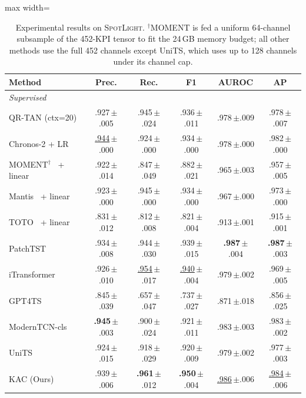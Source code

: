 \documentclass[conference]{IEEEtran}
\newcommand{\sd}[1]{\,{\fontsize{6pt}{7pt}\selectfont $\pm$#1}}
\begin{document}
\begin{table}[t]
  \centering
  \caption{Experimental results on \textsc{SpotLight}. $^\dagger$MOMENT is fed a uniform 64-channel subsample of the 452-KPI tensor to fit the 24\,GB memory budget; all other methods use the full 452 channels except UniTS, which uses up to 128 channels under its channel cap.}
  \label{tab:spotlight_benchmark}
  \small
  \setlength{\tabcolsep}{2pt}
  \begin{adjustbox}{max width=\columnwidth}
  \begin{tabular}{@{}lccccc@{}}
    \toprule
    \textbf{Method} & \textbf{Prec.} & \textbf{Rec.} & \textbf{F1} & \textbf{AUROC} & \textbf{AP} \\
    \midrule
    \multicolumn{6}{l}{\emph{Supervised}} \\
    QR-TAN (ctx=20)                      & .927\sd{.005} & .945\sd{.024} & .936\sd{.011} & .978\sd{.009} & .978\sd{.007} \\
    Chronos-2 + LR                       & \underline{.944}\sd{.000} & .924\sd{.000} & .934\sd{.000} & .978\sd{.000} & .982\sd{.000} \\
    MOMENT$^\dagger$~\cite{goswami2024moment} + linear      & .922\sd{.014} & .847\sd{.049} & .882\sd{.021} & .965\sd{.003} & .957\sd{.005} \\
    Mantis~\cite{feofanov2025mantis} + linear     & .923\sd{.000} & .945\sd{.000} & .934\sd{.000} & .967\sd{.000} & .973\sd{.000} \\
    TOTO~\cite{cohen2025toto} + linear            & .831\sd{.012} & .812\sd{.008} & .821\sd{.004} & .913\sd{.001} & .915\sd{.001} \\
    PatchTST~\cite{nie2023patchtst}      & .934\sd{.008} & .944\sd{.030} & .939\sd{.015} & \textbf{.987}\sd{.004} & \textbf{.987}\sd{.003} \\
    iTransformer~\cite{liu2024itransformer} & .926\sd{.010} & \underline{.954}\sd{.017} & \underline{.940}\sd{.004} & .979\sd{.002} & .969\sd{.005} \\
    GPT4TS~\cite{zhou2023gpt4ts}         & .845\sd{.039} & .657\sd{.047} & .737\sd{.027} & .871\sd{.018} & .856\sd{.025} \\
    ModernTCN-cls~\cite{luo2024moderntcn} & \textbf{.945}\sd{.003} & .900\sd{.024} & .921\sd{.011} & .983\sd{.003} & .983\sd{.002} \\
    UniTS~\cite{gao2024units}            & .924\sd{.015} & .918\sd{.029} & .920\sd{.009} & .979\sd{.002} & .977\sd{.003} \\
    KAC (Ours)                           & .939\sd{.006} & \textbf{.961}\sd{.012} & \textbf{.950}\sd{.004} & \underline{.986}\sd{.006} & \underline{.984}\sd{.006} \\

\end{tabular}
\end{adjustbox}
\end{table}
\end{document}
